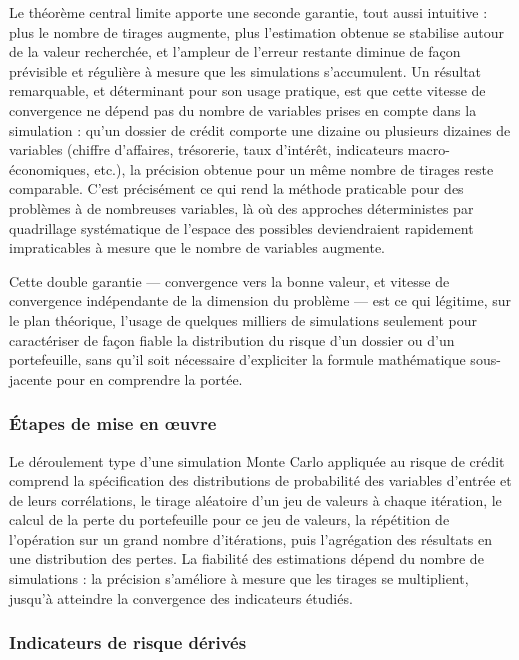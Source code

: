 \documentclass[a4paper,12pt,oneside]{report}
\begin{document}
Le théorème central limite apporte une seconde garantie, tout aussi intuitive : plus le nombre
de tirages augmente, plus l'estimation obtenue se stabilise autour de la valeur recherchée, et
l'ampleur de l'erreur restante diminue de façon prévisible et régulière à mesure que les
simulations s'accumulent. Un résultat remarquable, et déterminant pour son usage pratique, est
que cette vitesse de convergence ne dépend pas du nombre de variables prises en compte dans la
simulation : qu'un dossier de crédit comporte une dizaine ou plusieurs dizaines de variables
(chiffre d'affaires, trésorerie, taux d'intérêt, indicateurs macro-économiques, etc.), la
précision obtenue pour un même nombre de tirages reste comparable. C'est précisément ce qui
rend la méthode praticable pour des problèmes à de nombreuses variables, là où des approches
déterministes par quadrillage systématique de l'espace des possibles deviendraient rapidement
impraticables à mesure que le nombre de variables augmente.

Cette double garantie — convergence vers la bonne valeur, et vitesse de convergence
indépendante de la dimension du problème — est ce qui légitime, sur le plan théorique, l'usage
de quelques milliers de simulations seulement pour caractériser de façon fiable la distribution
du risque d'un dossier ou d'un portefeuille, sans qu'il soit nécessaire d'expliciter la formule
mathématique sous-jacente pour en comprendre la portée.

\subsubsection{Étapes de mise en \oe uvre}

Le déroulement type d'une simulation Monte Carlo appliquée au risque de crédit comprend la
spécification des distributions de probabilité des variables d'entrée et de leurs corrélations,
le tirage aléatoire d'un jeu de valeurs à chaque itération, le calcul de la perte du
portefeuille pour ce jeu de valeurs, la répétition de l'opération sur un grand nombre
d'itérations, puis l'agrégation des résultats en une distribution des pertes. La fiabilité des
estimations dépend du nombre de simulations : la précision s'améliore à mesure que les tirages
se multiplient, jusqu'à atteindre la convergence des indicateurs étudiés.

\subsubsection{Indicateurs de risque dérivés}
\end{document}
